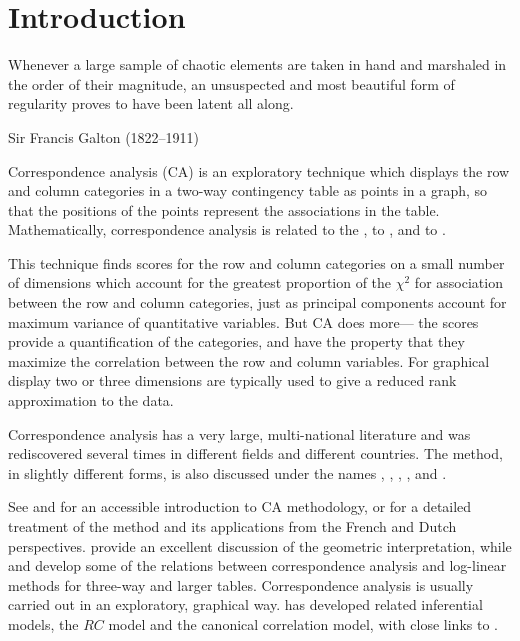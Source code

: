 \documentclass[11pt]{book}\usepackage[]{graphicx}\usepackage[]{color}
\begin{document}
\section{Introduction}

\epigraph{Whenever a large sample of
chaotic elements
are taken in hand and marshaled in the order of their magnitude, an
unsuspected and most beautiful form of regularity proves to have been
latent all along.}
{Sir Francis Galton (1822--1911)}

Correspondence analysis (CA) is an exploratory technique which displays
the row and column categories in a two-way contingency table as points
in a graph, so that the positions of the points represent the
associations in the table.
Mathematically, correspondence analysis is related to the ,
to ,
and to .

This technique finds
scores for the row and column categories on a small number of
dimensions which account for the greatest proportion of the
\(\chi^2\) for association between the row and column categories,
just as principal components account for maximum variance
of quantitative variables.  But CA does more---
the scores provide a quantification of the categories,
and have the property that they maximize the correlation
between the row and column variables.   For
graphical display two or three dimensions are typically used to give
a reduced rank approximation to the data.

Correspondence analysis has a very large, multi-national literature and
was rediscovered several times in different fields and different countries.   
The method, in slightly different forms, is also
discussed under the names
, ,
,
,
and .

See \citet{Greenacre:84} and \citet{Greenacre:2007}
for an accessible introduction to CA methodology,
or \citet{Gifi:81,Lebart-etal:84}
for a detailed treatment of the method and its applications
from the French and Dutch perspectives. 
\citet{GreenacreHastie:87} provide an excellent discussion of
the geometric interpretation,
while \citet{HeijdenLeeuw:85} and \citet{Heijden-etal:89}
develop some of the relations between correspondence analysis
and log-linear methods for three-way and larger tables.
Correspondence analysis is usually carried out in an exploratory,
graphical way. 
\citet{Goodman:81,Goodman:85,Goodman:86} has developed related inferential models, the $RC$ model and
the canonical correlation model, with close links to \CA.
\end{document}
